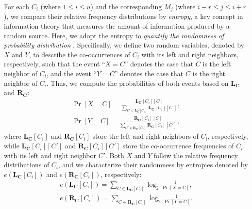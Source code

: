 \documentclass[bachelor]{thesis-uestc}
\begin{document}
For each $C_i$ (where $1\le i\le u$) and the corresponding $M_j$ (where 
$i-r\le j\le i+r$),  we compare their relative frequency distributions by
{\em entropy}, a key concept in information theory that measures the amount of
information produced by a random source. Here, we adopt the entropy to 
{\em quantify the randomness of probability distribution} \cite{wang08}.
Specifically, we define two random variables, denoted by $X$ and $Y$, to
describe the co-occurrences of $C_i$ with its left and right neighbors,
respectively, such that the event ``$X=C$'' denotes the case that $C$ is the
left neighbor of $C_i$, and the event ``$Y=C$'' denotes the case that $C$ is
the right neighbor of $C_i$.  Thus, we compute the probabilities of both
events based on $\mathbf{L_C}$ and $\mathbf{R_C}$:   
%
\begin{eqnarray}
\Pr[X = C] = \frac{\mathbf{L_C}[C_i][C]}{\sum_{C' \in \mathbf{L_C}[C_i]} \mathbf{L_C}[C_i][C']}, \nonumber \\
\Pr[Y = C] = \frac{\mathbf{R_C}[C_i][C]}{\sum_{C' \in \mathbf{R_C}[C_i]} \mathbf{R_C}[C_i][C']}, \nonumber
\end{eqnarray}
%
where $\mathbf{L_C}[C_i]$ and $\mathbf{R_C}[C_i]$ store the left and right
neighbors of $C_i$, respectively, while $\mathbf{L_C}[C_i][C']$ and
$\mathbf{R_C}[C_i][C']$ store the co-occurrence frequencies of $C_i$ with its
left and right neighbor $C'$.  Both $X$ and $Y$ follow the relative frequency
distributions of $C_i$, and we characterize their randomness by entropies
denoted by $e(\mathbf{L_C}[C_i])$ and $e(\mathbf{R_C}[C_i])$, respectively:  
%
\begin{eqnarray}
    e(\mathbf{L_C}[C_i]) = \sum_{C \in \mathbf{L_C}[C_i]} \log_2\frac{1}{\Pr[X = C]}, \nonumber \\
    e(\mathbf{R_C}[C_i]) = \sum_{C \in \mathbf{R_C}[C_i]} \log_2\frac{1}{\Pr[Y = C]}. \nonumber
\end{eqnarray}
\end{document}

